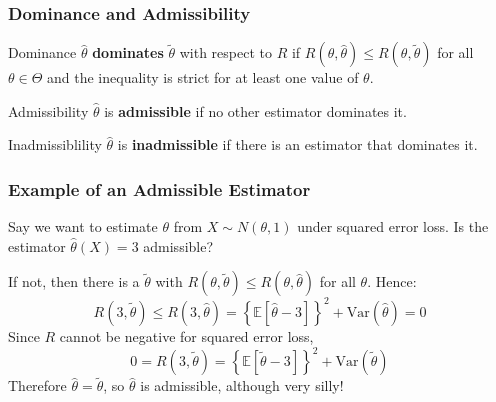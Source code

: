 \begin{frame}
  \frametitle{Dominance and Admissibility}

  \begin{block}{Dominance}
$\widehat{\theta}$ \textbf{dominates} $\widetilde{\theta}$ with respect to $R$ if $R(\theta,\widehat{\theta}) \leq R(\theta,\widetilde{\theta})$ for all $\theta \in \Theta$ and the inequality is strict for at least one value of  $\theta$. 
  \end{block}

  \begin{block}{Admissibility}
$\widehat{\theta}$ is \textbf{admissible} if no other estimator dominates it.
  \end{block}

  \begin{alertblock}{Inadmissiblility}
    $\widehat{\theta}$ is \textbf{inadmissible} if there is an estimator that dominates it. 
  \end{alertblock}

\end{frame}
\begin{frame}
  \frametitle{Example of an Admissible Estimator}


    Say we want to estimate $\theta$ from $X\sim N(\theta, 1)$ under squared error loss. 
    Is the estimator $\widehat{\theta}(X) = 3$ admissible?

    \vspace{2em}
    If not, then there is a $\widetilde{\theta}$ with $R(\theta,\widetilde{\theta}) \leq R(\theta,\widehat{\theta})$ for all $\theta$. 
    Hence:
    \[
      R(3, \widetilde{\theta}) \leq R(3, \widehat{\theta}) = \left\{\mathbb{E}\left[\widehat{\theta} - 3  \right] \right\}^2 + \mbox{Var}(\widehat{\theta}) = 0
    \]
    Since $R$ cannot be negative for squared error loss, 
    \[
      0 = R(3,\widetilde{\theta}) = \left\{ \mathbb{E}\left[ \widetilde{\theta} - 3 \right] \right\}^2 + \mbox{Var}(\widetilde{\theta})
    \]
    Therefore $\widehat{\theta} = \widetilde{\theta}$, so $\widehat{\theta}$ is admissible, although very silly!


\end{frame}
